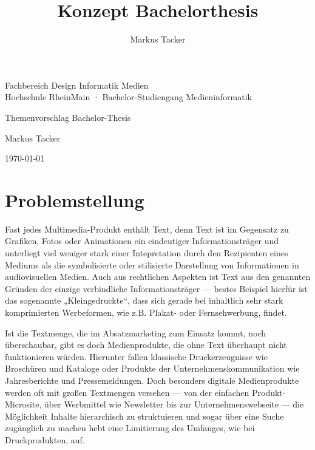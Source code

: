 \documentclass[11pt,a4paper]{article}
\begin{document}
\author{Markus Tacker}
\title{Konzept Bachelorthesis}

\begin{center}

\begin{small}Fachbereich Design Informatik Medien\\Hochschule RheinMain · Bachelor-Studiengang Medieninformatik\end{small}

\bigskip

\begin{huge}Themenvorschlag Bachelor-Thesis\end{huge}

\bigskip

\begin{large}Markus Tacker\end{large}

\begin{small}\today\end{small}

\end{center}

\section*{Problemstellung}

Fast jedes Multimedia-Produkt enthält Text, denn Text ist im Gegensatz zu Grafiken, Fotos oder Animationen ein eindeutiger Informationsträger und unterliegt viel weniger stark einer Intepretation durch den Rezipienten eines Mediums als die symbolisierte oder stilisierte Darstellung von Informationen in audiovisuellen Medien. Auch aus rechtlichen Aspekten ist Text aus den genannten Gründen der einzige verbindliche Informationsträger --- bestes Beispiel hierfür ist das sogenannte „Kleingedruckte“, dass sich gerade bei inhaltlich sehr stark komprimierten Werbeformen, wie z.B. Plakat- oder Fernsehwerbung, findet.

Ist die Textmenge, die im Absatzmarketing zum Einsatz kommt, noch überschaubar, gibt es doch Medienprodukte, die ohne Text überhaupt nicht funktionieren würden. Hierunter fallen klassische Druckerzeugnisse wie Broschüren und Kataloge oder Produkte der Unternehmenskommunikation wie Jahresberichte und Pressemeldungen. Doch besonders digitale Medienprodukte werden oft mit großen Textmengen versehen --- von der einfachen Produkt-Microsite, über Werbmittel wie Newsletter bis zur Unternehmenswebseite --- die Möglichkeit Inhalte hierarchisch zu struktuieren und sogar über eine Suche zugänglich zu machen hebt eine Limitierung des Umfanges, wie bei Druckprodukten, auf. 
\end{document}
